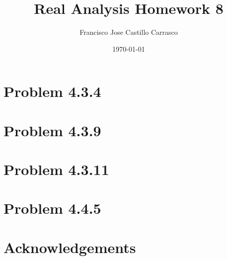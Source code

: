 




\title{Real Analysis Homework 8}
\author{Francisco Jose Castillo Carrasco}
\date{\today}
\maketitle




\section{Problem 4.3.4}


\section{Problem 4.3.9}

\newpage
\section{Problem 4.3.11}


\section{Problem 4.4.5}


\section*{Acknowledgements}






